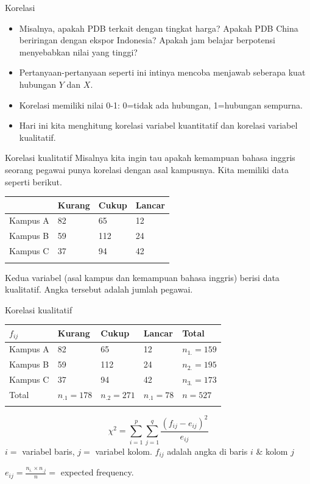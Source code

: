 \documentclass[
  ignorenonframetext,
]{beamer}
\begin{document}
\begin{frame}{Korelasi}
\label{korelasi-1}
\begin{itemize}
\item
  Misalnya, apakah PDB terkait dengan tingkat harga? Apakah PDB China
  beriringan dengan ekspor Indonesia? Apakah jam belajar berpotensi
  menyebabkan nilai yang tinggi?
\item
  Pertanyaan-pertanyaan seperti ini intinya mencoba menjawab seberapa
  kuat hubungan \(Y\) dan \(X\).
\item
  Korelasi memiliki nilai 0-1: 0=tidak ada hubungan, 1=hubungan
  sempurna.
\item
  Hari ini kita menghitung korelasi variabel kuantitatif dan korelasi
  variabel kualitatif.
\end{itemize}
\end{frame}

\begin{frame}{Korelasi kualitatif}
\label{korelasi-kualitatif}
Misalnya kita ingin tau apakah kemampuan bahasa inggris seorang pegawai
punya korelasi dengan asal kampusnya. Kita memiliki data seperti
berikut.

\begin{longtable}[]{@{}llll@{}}
\toprule\noalign{}
& Kurang & Cukup & Lancar \\
\midrule\noalign{}
\endhead
Kampus A & 82 & 65 & 12 \\
Kampus B & 59 & 112 & 24 \\
Kampus C & 37 & 94 & 42 \\
\bottomrule\noalign{}
\end{longtable}

Kedua variabel (asal kampus dan kemampuan bahasa inggris) berisi data
kualitatif. Angka tersebut adalah jumlah pegawai.
\end{frame}

\begin{frame}{Korelasi kualitatif}
\label{korelasi-kualitatif-1}
\begin{longtable}[]{@{}lllll@{}}
\toprule\noalign{}
\(f_{ij}\) & Kurang & Cukup & Lancar & Total \\
\midrule\noalign{}
\endhead
Kampus A & 82 & 65 & 12 & \(n_{1.}=159\) \\
Kampus B & 59 & 112 & 24 & \(n_{2.}=195\) \\
Kampus C & 37 & 94 & 42 & \(n_{3.}=173\) \\
Total & \(n_{.1}=178\) & \(n_{.2}=271\) & \(n_{.1}=78\) & \(n=527\) \\
\bottomrule\noalign{}
\end{longtable}

\[
\chi^2=\sum_{i=1}^{p} \sum_{j=1}^{q} \frac{(f_{ij}-e_{ij})^2}{e_{ij}}
\] \(i=\) variabel baris, \(j=\) variabel kolom. \(f_{ij}\) adalah angka
di baris \(i\) \& kolom \(j\)

\(e_{ij}=\frac{n_{i.}\times n_{.j}}{n}=\) expected frequency.
\end{frame}
\end{document}
